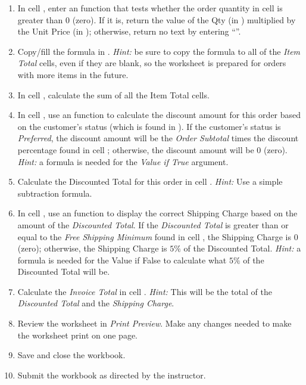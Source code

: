 \begin{enumbox}
\begin{enumerate}
		\item In cell , enter an  function that tests whether the order quantity in cell  is greater than $ 0 $ (zero). If it is, return the value of the Qty (in ) multiplied by the Unit Price (in ); otherwise, return no text by entering ``''.
		\item Copy/fill the formula in  . \textit{Hint:} be sure to copy the formula to all of the \textit{Item Total} cells, even if they are blank, so the worksheet is prepared for orders with more items in the future.
		\item In cell , calculate the sum of all the Item Total cells.
		\item In cell , use an  function to calculate the discount amount for this order based on the customer's status (which is found in ). If the customer's status is \textit{Preferred}, the discount amount will be the \textit{Order Subtotal} times the discount percentage found in cell ; otherwise, the discount amount will be $ 0 $ (zero). \textit{Hint:} a formula is needed for the \textit{Value if True} argument.
		\item Calculate the Discounted Total for this order in cell . \textit{Hint:} Use a simple subtraction formula.
		\item In cell , use an  function to display the correct Shipping Charge based on the amount of the \textit{Discounted Total}. If the \textit{Discounted Total} is greater than or equal to the \textit{Free Shipping Minimum} found in cell , the Shipping Charge is $ 0 $ (zero); otherwise, the Shipping Charge is $ 5\% $ of the Discounted Total. \textit{Hint:} a formula is needed for the Value if False to calculate what $ 5\% $ of the Discounted Total will be.
		\item Calculate the \textit{Invoice Total} in cell . \textit{Hint:} This will be the total of the \textit{Discounted Total} and the \textit{Shipping Charge}.
		\item Review the worksheet in \textit{Print Preview}. Make any changes needed to make the worksheet print on one page.
		\item Save and close the  workbook.
		\item Submit the  workbook as directed by the instructor.
	\end{enumerate}
\end{enumbox}
